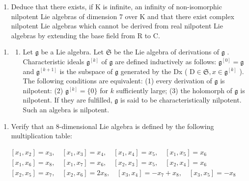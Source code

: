 \begin{enumerate}
\def\labelenumi{(\alph{enumi})}
\setcounter{enumi}{3}
\tightlist
\item
  Deduce that there exists, if K is infinite, an infinity of non-isomorphic nilpotent Lie algebras of dimension 7 over K and that there exist complex nilpotent Lie algebras which cannot be derived from real nilpotent Lie algebras by extending the base field from R to C.
\end{enumerate}

\begin{enumerate}
\def\labelenumi{\arabic{enumi}.}
\setcounter{enumi}{18}
\tightlist
\item
  \begin{enumerate}
  \def\labelenumii{(\alph{enumii})}
  \tightlist
  \item
    Let \(\mathfrak{g}\) be a Lie algebra. Let \(\mathfrak{S}\) be the Lie algebra of derivations of \(\mathfrak{g}\) . Characteristic ideals \(\mathfrak{g}^{[k]}\) of \(\mathfrak{g}\) are defined inductively as follows: \(\mathfrak{g}^{[0]} = \mathfrak{g}\) and \(\mathfrak{g}^{[k+1]}\) is the subspace of \(\mathfrak{g}\) generated by the Dx ( \(\mathrm{D} \in \mathfrak{S}, x \in \mathfrak{g}^{[k]}\) ). The following conditions are equivalent: (1) every derivation of \(\mathfrak{g}\) is nilpotent: (2) \(\mathfrak{g}^{[k]} = \{0\}\) for \(k\) sufficiently large; (3) the holomorph of \(\mathfrak{g}\) is nilpotent. If they are fulfilled, \(\mathfrak{g}\) is said to be characteristically nilpotent. Such an algebra is nilpotent.
  \end{enumerate}
\end{enumerate}

\begin{enumerate}
\def\labelenumi{(\alph{enumi})}
\setcounter{enumi}{1}
\tightlist
\item
  Verify that an 8-dimensional Lie algebra is defined by the following multiplication table:
\end{enumerate}

\[
\begin{array}{r} \left[ x _ {1}, x _ {2} \right] = x _ {3}, \quad \left[ x _ {1}, x _ {3} \right] = x _ {4}, \quad \left[ x _ {1}, x _ {4} \right] = x _ {5}, \quad \left[ x _ {1}, x _ {5} \right] = x _ {6} \\ \left[ x _ {1}, x _ {6} \right] = x _ {8}, \quad \left[ x _ {1}, x _ {7} \right] = x _ {6}, \quad \left[ x _ {2}, x _ {3} \right] = x _ {5}, \quad \left[ x _ {2}, x _ {4} \right] = x _ {6} \\ \left[ x _ {2}, x _ {5} \right] = x _ {7}, \quad \left[ x _ {2}, x _ {6} \right] = 2 x _ {8}, \quad \left[ x _ {3}, x _ {4} \right] = - x _ {7} + x _ {8}, \quad \left[ x _ {3}, x _ {5} \right] = - x _ {8} \end{array}
\]

